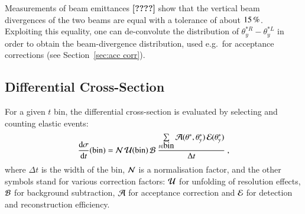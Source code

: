 Measurements of beam emittances \textbf{[????]} show that the vertical beam divergences of the two beams are equal with a tolerance of about $15\,{\rm \%}$. Exploiting this equality, one can de-convolute the distribution of $\theta_y^{*R} - \theta_y^{*L}$ in order to obtain the beam-divergence distribution, used e.g.~for acceptance corrections (see Section~\ref{sec:acc corr}).

\subsection{Differential Cross-Section}
\label{sec:diff cs}

For a given $t$ bin, the differential cross-section is evaluated by selecting and counting elastic events:
\begin{equation}
{\d\sigma\over \d t}(\hbox{bin}) =
	{\cal N}\, {\cal U}({\rm bin})\, {\cal B}\ 
	{\sum\limits_{t \in \hbox{bin}} {\cal A}(\theta^*, \theta_y^*)\, {\cal E}(\theta_y^*)\over \Delta t}\ ,
\end{equation}
where $\Delta t$ is the width of the bin, ${\cal N}$ is a normalisation factor, 
and the other symbols stand for various correction factors:
${\cal U}$ for unfolding of resolution effects, ${\cal B}$ for background subtraction, ${\cal A}$ for acceptance correction and ${\cal E}$ for detection and reconstruction efficiency.

